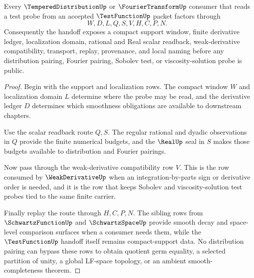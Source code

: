 \begin{theorem}
\label{thm:test-function-tempered-distribution-handoff}
Every $\TemperedDistributionUp$ or $\FourierTransformUp$ consumer that reads a test probe from an accepted $\TestFunctionUp$ packet factors through
$$
W,D,L,Q,S,V,H,C,P,N .
$$
Consequently the handoff exposes a compact support window, finite derivative ledger, localization domain, rational and Real scalar readback, weak-derivative compatibility, transport, replay, provenance, and local naming before any distribution pairing, Fourier pairing, Sobolev test, or viscosity-solution probe is public.
\end{theorem}
\begin{proof}
Begin with the support and localization rows. The compact window $W$ and localization domain $L$ determine where the probe may be read, and the derivative ledger $D$ determines which smoothness obligations are available to downstream chapters.

Use the scalar readback route $Q,S$. The regular rational and dyadic observations in $Q$ provide the finite numerical budgets, and the $\RealUp$ seal in $S$ makes those budgets available to distribution and Fourier pairings.

Now pass through the weak-derivative compatibility row $V$. This is the row consumed by $\WeakDerivativeUp$ when an integration-by-parts sign or derivative order is needed, and it is the row that keeps Sobolev and viscosity-solution test probes tied to the same finite carrier.

Finally replay the route through $H,C,P,N$. The sibling rows from $\SchwartzFunctionUp$ and $\SchwartzSpaceUp$ provide smooth decay and space-level comparison surfaces when a consumer needs them, while the $\TestFunctionUp$ handoff itself remains compact-support data. No distribution pairing can bypass these rows to obtain quotient germ equality, a selected partition of unity, a global LF-space topology, or an ambient smooth-completeness theorem.
\end{proof}


